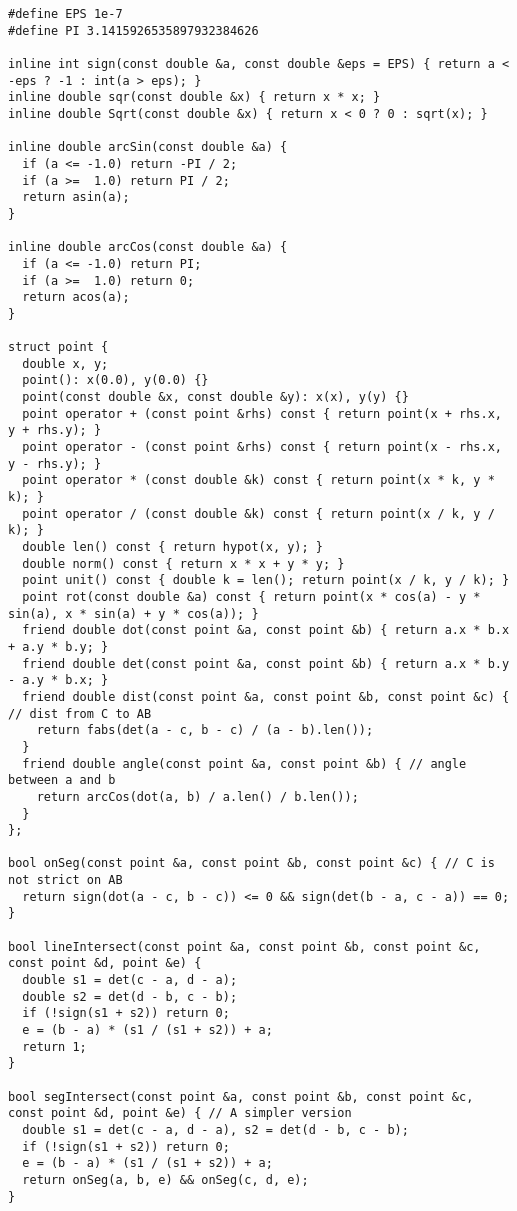 \begin{lstlisting}
#define EPS 1e-7
#define PI 3.1415926535897932384626

inline int sign(const double &a, const double &eps = EPS) { return a < -eps ? -1 : int(a > eps); }
inline double sqr(const double &x) { return x * x; }
inline double Sqrt(const double &x) { return x < 0 ? 0 : sqrt(x); }

inline double arcSin(const double &a) {
  if (a <= -1.0) return -PI / 2;
  if (a >=  1.0) return PI / 2;
  return asin(a);
}

inline double arcCos(const double &a) {
  if (a <= -1.0) return PI;
  if (a >=  1.0) return 0;
  return acos(a);
}

struct point {
  double x, y;
  point(): x(0.0), y(0.0) {}
  point(const double &x, const double &y): x(x), y(y) {}
  point operator + (const point &rhs) const { return point(x + rhs.x, y + rhs.y); }
  point operator - (const point &rhs) const { return point(x - rhs.x, y - rhs.y); }
  point operator * (const double &k) const { return point(x * k, y * k); }
  point operator / (const double &k) const { return point(x / k, y / k); }
  double len() const { return hypot(x, y); }
  double norm() const { return x * x + y * y; }
  point unit() const { double k = len(); return point(x / k, y / k); }
  point rot(const double &a) const { return point(x * cos(a) - y * sin(a), x * sin(a) + y * cos(a)); }
  friend double dot(const point &a, const point &b) { return a.x * b.x + a.y * b.y; }
  friend double det(const point &a, const point &b) { return a.x * b.y - a.y * b.x; }
  friend double dist(const point &a, const point &b, const point &c) { // dist from C to AB
    return fabs(det(a - c, b - c) / (a - b).len());
  }
  friend double angle(const point &a, const point &b) { // angle between a and b
    return arcCos(dot(a, b) / a.len() / b.len());
  }
};

bool onSeg(const point &a, const point &b, const point &c) { // C is not strict on AB
  return sign(dot(a - c, b - c)) <= 0 && sign(det(b - a, c - a)) == 0;
}

bool lineIntersect(const point &a, const point &b, const point &c, const point &d, point &e) {
  double s1 = det(c - a, d - a);
  double s2 = det(d - b, c - b);
  if (!sign(s1 + s2)) return 0;
  e = (b - a) * (s1 / (s1 + s2)) + a;
  return 1;
}

bool segIntersect(const point &a, const point &b, const point &c, const point &d, point &e) { // A simpler version
  double s1 = det(c - a, d - a), s2 = det(d - b, c - b);
  if (!sign(s1 + s2)) return 0;
  e = (b - a) * (s1 / (s1 + s2)) + a;
  return onSeg(a, b, e) && onSeg(c, d, e);
}


\end{lstlisting}
